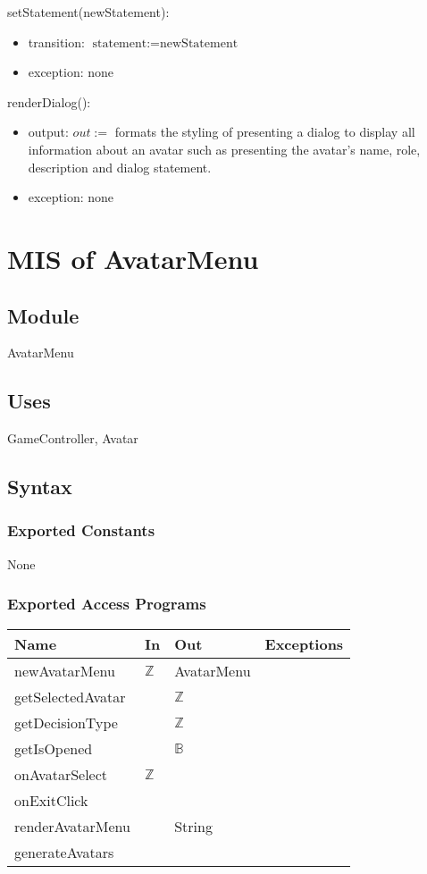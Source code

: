 \documentclass[12pt, titlepage]{article}
\begin{document}
\noindent setStatement(newStatement):
\begin{itemize}
\item transition: $\text{statement} := \text{newStatement}$
\item exception: none
\end{itemize}

\noindent renderDialog():
\begin{itemize}
\item output: $out := $ formats the styling of presenting a dialog to display all information about an avatar such as presenting the avatar's name, role, description and dialog statement.  
\item exception: none
\end{itemize}


\newpage

\section{MIS of AvatarMenu} 


\subsection{Module}
AvatarMenu

\subsection{Uses}
GameController, Avatar


\subsection{Syntax}

\subsubsection{Exported Constants}
None

\subsubsection{Exported Access Programs}

\begin{center}
\begin{tabular}{p{3.5cm} p{4cm} p{4cm} p{2cm}}
\hline
\textbf{Name} & \textbf{In} & \textbf{Out} & \textbf{Exceptions} \\
\hline
newAvatarMenu & $\mathbb{Z}$ & AvatarMenu & \\
\hline
getSelectedAvatar &  & $\mathbb{Z}$ & \\
\hline
getDecisionType &  & $\mathbb{Z}$ & \\
\hline
getIsOpened &  & $\mathbb{B}$ & \\
\hline
onAvatarSelect &  $\mathbb{Z}$ &  & \\
\hline
onExitClick &   &  & \\
\hline
renderAvatarMenu &  & String & \\
\hline
generateAvatars &  &  & \\
\hline
\end{tabular}
\end{center}
\end{document}
